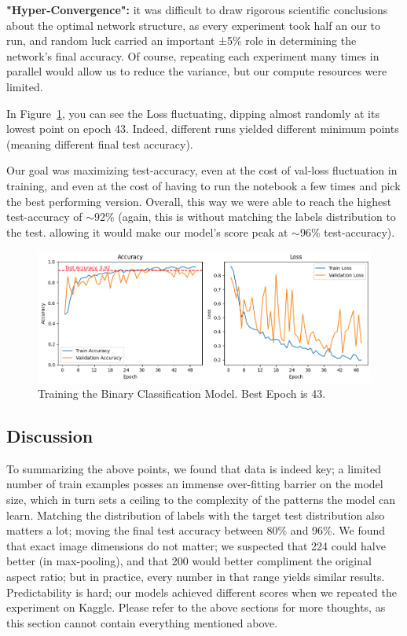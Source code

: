 \documentclass{article}
\begin{document}
\textbf{"Hyper-Convergence":} it was difficult to draw rigorous scientific conclusions about the optimal network structure, as every experiment took half an our to run, and random luck carried an important ±5\% role in determining the network's final accuracy. Of course, repeating each experiment many times in parallel would allow us to reduce the variance, but our compute resources were limited.

In Figure~\ref{fig:model_1_history}, you can see the Loss fluctuating, dipping almost randomly at its lowest point on epoch 43. Indeed, different runs yielded different minimum points (meaning different final test accuracy). 

Our goal was maximizing test-accuracy, even at the cost of val-loss fluctuation in training, and even at the cost of having to run the notebook a few times and pick the best performing version. Overall, this way we were able to reach the highest test-accuracy of $\sim$92\% (again, this is without matching the labels distribution to the test. allowing it would make our model's score peak at $\sim$96\% test-accuracy).


\begin{figure}[H]
    \centering
    \includegraphics[width=1\linewidth]{model_1_history.png}
    \caption{Training the Binary Classification Model. Best Epoch is 43.}
    \label{fig:model_1_history}
\end{figure}

\subsection{Discussion}
To summarizing the above points, we found that data is indeed key; a limited number of train examples posses an immense over-fitting barrier on the model size, which in turn sets a ceiling to the complexity of the patterns the model can learn. Matching the distribution of labels with the target test distribution also matters a lot; moving the final test accuracy between 80\% and 96\%. We found that exact image dimensions do not matter; we suspected that 224 could halve better (in max-pooling), and that 200 would better compliment the original aspect ratio; but in practice, every number in that range yields similar results. Predictability is hard; our models achieved different scores when we repeated the experiment on Kaggle. Please refer to the above sections for more thoughts, as this section cannot contain everything mentioned above.
\end{document}
